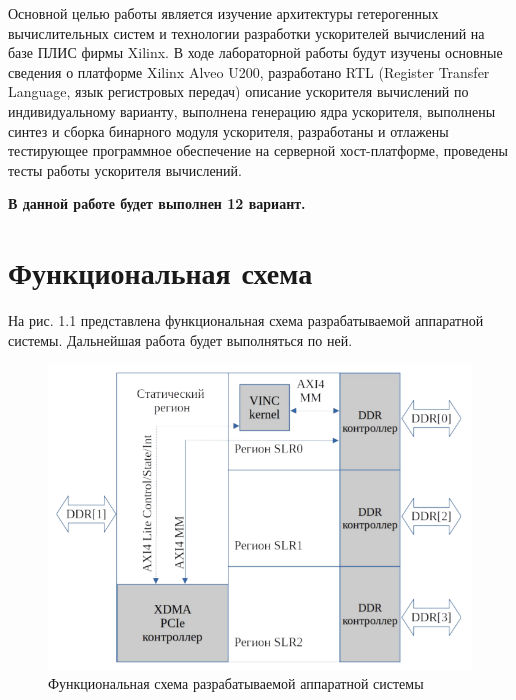 \setcounter{page}{2}


Основной целью работы является изучение архитектуры гетерогенных вычислительных систем и технологии разработки ускорителей вычислений на базе ПЛИС фирмы Xilinx. В ходе лабораторной работы будут изучены основные сведения о платформе Xilinx Alveo U200,
разработано RTL (Register Transfer Language, язык регистровых передач) описание ускорителя вычислений по индивидуальному варианту, выполнена генерацию ядра ускорителя, выполнены синтез и сборка бинарного модуля ускорителя, разработаны и отлажены тестирующее программное обеспечение на серверной хост-платформе, проведены
тесты работы ускорителя вычислений. 

\textbf{В данной работе будет выполнен 12 вариант.}

\chapter{Функциональная схема}

На рис. 1.1 представлена функциональная схема разрабатываемой аппаратной системы. Дальнейшая работа будет выполняться по ней.

\captionsetup{singlelinecheck = false, justification=centering}
\begin{figure}[H]
	\begin{center}
		\includegraphics[scale=0.8]{assets/scheme.png}
	\end{center}
	\caption{Функциональная схема разрабатываемой аппаратной системы}
\end{figure}

